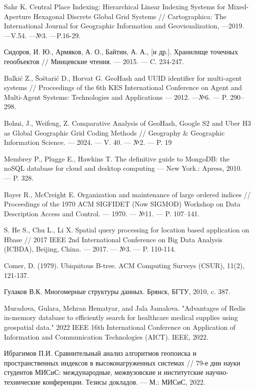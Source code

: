 \begin{thebibliography}{99}
Sahr K. Central Place Indexing: Hierarchical Linear Indexing Systems for Mixed-Aperture Hexagonal Discrete Global Grid Systems // Cartographica: The International Journal for Geographic Information and Geovisualization, ---2019. ---V.54. ---№3. ---P.16-29.

Сидоров, И. Ю., Армяков, А. О., Байтин, А. А., [и др.]. Хранилище точечных геообъектов // Минцевские чтения. --- 2015. --- C. 234-247.

Balkić Z., Šoštarić D., Horvat G. GeoHash and UUID identifier for multi-agent systems // Proceedings of the 6th KES International Conference on Agent and Multi-Agent Systems: Technologies and Applications --- 2012. ---№6. --- P. 290–298.

Bohui, J., Weifeng, Z. Comparative Analysis of GeoHash, Google S2 and Uber H3 as Global Geographic Grid Coding Methods // Geography & Geographic Information Science. --- 2024. --- V. 40. --- №2. --- P. 19

Membrey P., Plugge E., Hawkins T. The definitive guide to MongoDB: the
noSQL database for cloud and desktop computing --- New York.: Apress, 2010. --- P. 328.

Bayer R., McCreight E. Organization and maintenance of large ordered indices // Proceedings of the 1970 ACM SIGFIDET (Now SIGMOD) Workshop on Data Description Access and Control. --- 1970. --- №11. --- P. 107–141.

S. He S., Chu L., Li X. Spatial query processing for location based application on Hbase // 2017 IEEE 2nd International Conference on Big Data Analysis (ICBDA), Beijing, China. --- 2017. --- №3. --- P. 110-114.

Comer, D. (1979). Ubiquitous B-tree. ACM Computing Surveys (CSUR), 11(2), 121-137.

Гулаков В.К. Многомерные структуры данных. Брянск, БГТУ, 2010, c. 387.

Muradova, Gulara, Mehran Hematyar, and Jala Jamalova. "Advantages of Redis in-memory database to efficiently search for healthcare medical supplies using geospatial data." 2022 IEEE 16th International Conference on Application of Information and Communication Technologies (AICT). IEEE, 2022.

Ибрагимов П.И. Сравнительный анализ алгоритмов геопоиска и пространственных индексов в высоконагруженных системах // 79-е дни науки студентов МИСиС: международные, межвузовские и институтские научно-технические конференции. Тезисы докладов. — М.: МИСиС, 2022. 

\end{thebibliography}

